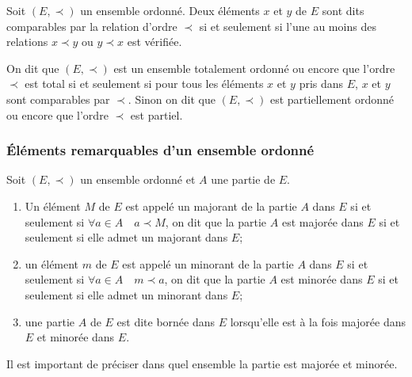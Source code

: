 \begin{defdef}
    Soit \((E, \prec)\) un ensemble ordonné. Deux éléments \(x\) et \(y\) de 
    \(E\) sont dits comparables par la relation d'ordre \(\prec\) si et 
    seulement si l'une au moins des relations \(x \prec y\) ou \(y \prec x\) est 
    vérifiée.
\end{defdef}

\begin{defdef}
    On dit que \((E, \prec)\) est un ensemble totalement ordonné ou encore que 
    l'ordre \(\prec\) est total si et seulement si pour tous les éléments \(x\) 
    et \(y\) pris dans \(E\), \(x\) et \(y\) sont comparables par \(\prec\). 
    Sinon on dit que \((E,\prec)\) est partiellement ordonné ou encore que 
    l'ordre \(\prec\) est partiel.
\end{defdef}

\subsubsection{Éléments remarquables d'un ensemble ordonné}
\label{chap3-subsubsec:elementremarquables}

Soit \((E,\prec)\) un ensemble ordonné et \(A\) une partie de \(E\).

\begin{defdef}
    \begin{enumerate}
        \item Un élément \(M\) de \(E\) est appelé un majorant de la partie 
            \(A\) dans \(E\) si et seulement si \(\forall a \in A \quad a \prec 
            M\), on dit que la partie \(A\) est majorée dans \(E\) si et 
            seulement si elle admet un majorant dans \(E\);
        \item un élément \(m\) de \(E\) est appelé un minorant de la partie 
            \(A\) dans \(E\) si et seulement si \(\forall a \in A \quad m \prec 
            a\), on dit que la partie \(A\) est minorée dans \(E\) si et 
            seulement si elle admet un minorant dans \(E\);
        \item une partie \(A\) de \(E\) est dite bornée dans \(E\) lorsqu'elle 
            est à la fois majorée dans \(E\) et minorée dans \(E\).
    \end{enumerate}
    Il est important de préciser dans quel ensemble la partie est majorée et 
    minorée.
\end{defdef}


